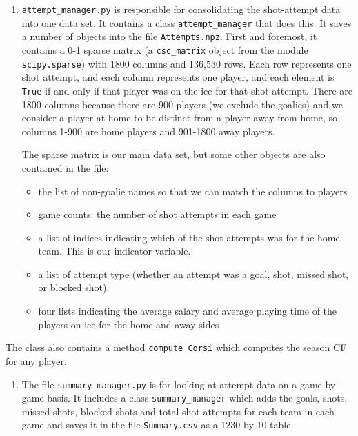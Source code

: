 \documentclass[11pt]{article}
\providecommand{\tightlist}{%
      \setlength{\itemsep}{0pt}\setlength{\parskip}{0pt}}
\begin{document}
\begin{enumerate}
\def\labelenumi{\arabic{enumi}.}
\item
  \texttt{attempt\_manager.py} is responsible for consolidating the
  shot-attempt data into one data set. It contains a class
  \texttt{attempt\_manager} that does this. It saves a number of objects
  into the file \texttt{Attempts.npz}. First and foremost, it contains a
  0-1 sparse matrix (a \texttt{csc\_matrix} object from the module
  \texttt{scipy.sparse}) with 1800 columns and 136,530 rows. Each row
  represents one shot attempt, and each column represents one player,
  and each element is \texttt{True} if and only if that player was on
  the ice for that shot attempt. There are 1800 columns because there
  are 900 players (we exclude the goalies) and we consider a player
  at-home to be distinct from a player away-from-home, so columns 1-900
  are home players and 901-1800 away players.

  The sparse matrix is our main data set, but some other objects are
  also contained in the file:

  \begin{itemize}
  \tightlist
  \item
    the list of non-goalie names so that we can match the columns to
    players
  \item
    game counts: the number of shot attempts in each game
  \item
    a list of indices indicating which of the shot attempts was for the
    home team. This is our indicator variable.
  \item
    a list of attempt type (whether an attempt was a goal, shot, missed
    shot, or blocked shot).
  \item
    four lists indicating the average salary and average playing time of
    the players on-ice for the home and away sides
  \end{itemize}
\end{enumerate}

The class also contains a method \texttt{compute\_Corsi} which computes
the season CF for any player.

\begin{enumerate}
\def\labelenumi{\arabic{enumi}.}
\setcounter{enumi}{1}
\tightlist
\item
  The file \texttt{summary\_manager.py} is for looking at attempt data
  on a game-by-game basis. It includes a class \texttt{summary\_manager}
  which adds the goals, shots, missed shots, blocked shots and total
  shot attempts for each team in each game and saves it in the file
  \texttt{Summary.csv} as a 1230 by 10 table.
\end{enumerate}
\end{document}
